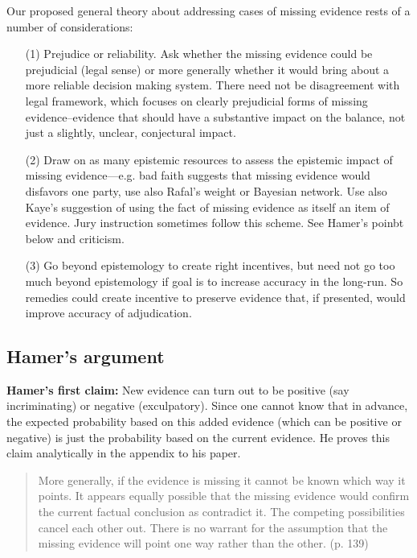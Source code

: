 \documentclass[
  10pt,
  dvipsnames,enabledeprecatedfontcommands]{scrartcl}
\begin{document}
Our proposed general theory about addressing cases of missing evidence
rests of a number of considerations:

\begin{itemize}
\item[(1)] Prejudice or reliability. Ask whether the missing evidence could be prejudicial (legal sense) or more generally whether it would bring about a more reliable decision making system. There need not be disagreement with legal framework, which focuses on clearly prejudicial forms of missing evidence--evidence that should have a substantive impact on the balance, not just a slightly, unclear, conjectural impact.

\item[(2)] Draw on as many epistemic resources to assess the epistemic impact of missing evidence---e.g. bad faith suggests that missing evidence would disfavors
one party, use also Rafal's weight or Bayesian network. Use also Kaye's suggestion of using the fact of missing evidence as itself an item of evidence. Jury instruction sometimes follow this scheme. See Hamer's poinbt below and criticism.

\item[(3)] Go beyond epistemology to create right incentives, but need not go too much beyond epistemology if goal is to increase accuracy in the long-run. So remedies could create incentive to preserve evidence that, if presented, would improve accuracy of adjudication.

\end{itemize}

\hypertarget{hamers-argument}{%
\subsection{Hamer's argument}\label{hamers-argument}}

\textbf{Hamer's first claim:} New evidence can turn out to be positive
(say incriminating) or negative (exculpatory). Since one cannot know
that in advance, the expected probability based on this added evidence
(which can be positive or negative) is just the probability based on the
current evidence. He proves this claim analytically in the appendix to
his paper.

\begin{quote}
More generally, if the evidence is missing it cannot be known which way it points.
It appears equally possible that the missing evidence would confirm the current factual conclusion as
contradict it. The competing possibilities cancel each other out. There is no warrant for the assumption
that the missing evidence will point one way rather than the other. (p. 139)
\end{quote}
\end{document}

